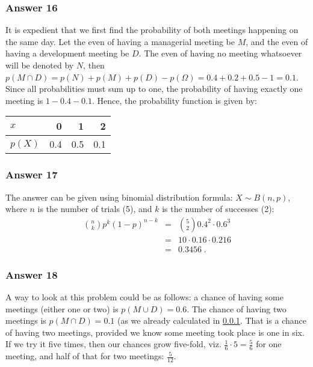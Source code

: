 \documentclass[11pt]{article}
\begin{document}
\subsubsection{Answer 16}
\label{sec:orgheadline20}
It is expedient that we first find the probability of both meetings happening
on the same day.  Let the even of having a managerial meeting be \(M\), and
the even of having a development meeting be \(D\).  The even of having no
meeting whatsoever will be denoted by \(N\), then
\(p(M \cap D) = p(N) + p(M) + p(D) - p(\Omega) = 0.4 + 0.2 + 0.5 - 1 = 0.1\).
Since all probabilities must sum up to one, the probability of having exactly
one meeting is \(1 - 0.4 - 0.1\).  Hence, the probability function is given by:

\begin{center}
\begin{tabular}{lrrr}
\(x\) & 0 & 1 & 2\\
\hline
\(p(X)\) & 0.4 & 0.5 & 0.1\\
\end{tabular}
\end{center}

\subsubsection{Answer 17}
\label{sec:orgheadline21}
The answer can be given using binomial distribution formula:
\(X \sim B(n, p)\), where \(n\) is the number of trials (5), and \(k\) is the number
of successes (2):
\begin{eqnarray*}
  {n \choose k} p^k (1 - p)^{n - k} &=& {5 \choose 2} 0.4^2 \cdot 0.6^3 \\
                                   &=& 10 \cdot 0.16 \cdot 0.216 \\
                                   &=& 0.3456\;.
\end{eqnarray*}

\subsubsection{Answer 18}
\label{sec:orgheadline22}
A way to look at this problem could be as follows: a chance of having some
meetings (either one or two) is \(p(M \cup D) = 0.6\).  The chance of having
two meetings is \(p(M \cap D) = 0.1\) (as we already calculated in \ref{sec:orgheadline20}.
That is a chance of having two meetings, provided we know some meeting took
place is one in six.  If we try it five times, then our chances grow
five-fold, viz. \(\frac{1}{6} \cdot 5 = \frac{5}{6}\) for one meeting, and
half of that for two meetings: \(\frac{5}{12}\).
\end{document}
